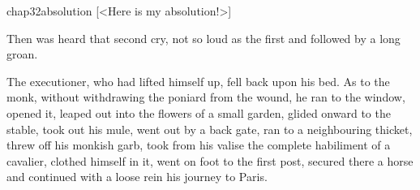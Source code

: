\begin{bwbigpic}
	[\basicscale] 
	{chap32absolution}
	[<Here is my absolution!>]
\end{bwbigpic}

Then was heard that second cry, not so loud as the first and followed by a long groan.

The executioner, who had lifted himself up, fell back upon his bed. As to the monk, without withdrawing the poniard from the wound, he ran to the window, opened it, leaped out into the flowers of a small garden, glided onward to the stable, took out his mule, went out by a back gate, ran to a neighbouring thicket, threw off his monkish garb, took from his valise the complete habiliment of a cavalier, clothed himself in it, went on foot to the first post, secured there a horse and continued with a loose rein his journey to Paris. 